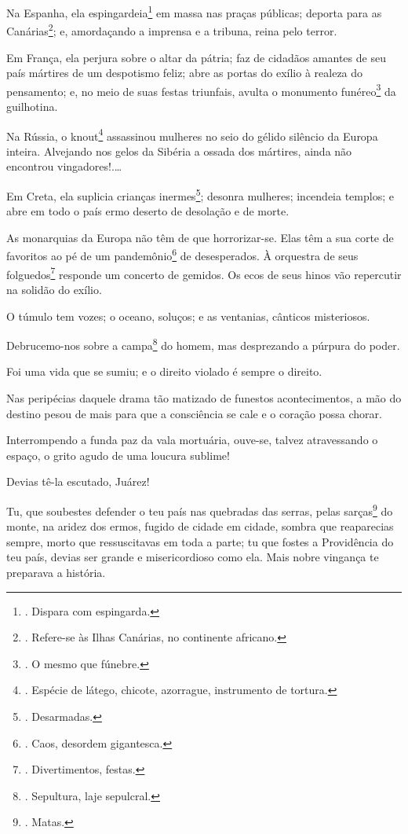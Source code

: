 Na Espanha, ela espingardeia\footnote{. Dispara com espingarda.} em
massa nas praças públicas; deporta para as Canárias\footnote{. Refere-se
  às Ilhas Canárias, no continente africano.}; e, amordaçando a imprensa
e a tribuna, reina pelo terror.

Em França, ela perjura sobre o altar da pátria; faz de cidadãos amantes
de seu país mártires de um despotismo feliz; abre as portas do exílio à
realeza do pensamento; e, no meio de suas festas triunfais, avulta o
monumento funéreo\footnote{. O mesmo que fúnebre.} da guilhotina.

Na Rússia, o knout\footnote{. Espécie de látego, chicote, azorrague,
  instrumento de tortura.} assassinou mulheres no seio do gélido
silêncio da Europa inteira. Alvejando nos gelos da Sibéria a ossada dos
mártires, ainda não encontrou vingadores!.\ldots{}

Em Creta, ela suplicia crianças inermes\footnote{. Desarmadas.}; desonra
mulheres; incendeia templos; e abre em todo o país ermo deserto de
desolação e de morte.

As monarquias da Europa não têm de que horrorizar-se. Elas têm a sua
corte de favoritos ao pé de um pandemônio\footnote{. Caos, desordem
  gigantesca.} de desesperados. À orquestra de seus folguedos\footnote{.
  Divertimentos, festas.} responde um concerto de gemidos. Os ecos de
seus hinos vão repercutir na solidão do exílio.

O túmulo tem vozes; o oceano, soluços; e as ventanias, cânticos
misteriosos.

Debrucemo-nos sobre a campa\footnote{. Sepultura, laje sepulcral.} do
homem, mas desprezando a púrpura do poder.

Foi uma vida que se sumiu; e o direito violado é sempre o direito.

Nas peripécias daquele drama tão matizado de funestos acontecimentos, a
mão do destino pesou de mais para que a consciência se cale e o coração
possa chorar.

Interrompendo a funda paz da vala mortuária, ouve-se, talvez
atravessando o espaço, o grito agudo de uma loucura sublime!

Devias tê-la escutado, Juárez!

Tu, que soubestes defender o teu país nas quebradas das serras, pelas
sarças\footnote{. Matas.} do monte, na aridez dos ermos, fugido de
cidade em cidade, sombra que reaparecias sempre, morto que ressuscitavas
em toda a parte; tu que fostes a Providência do teu país, devias ser
grande e misericordioso como ela. Mais nobre vingança te preparava a
história.

